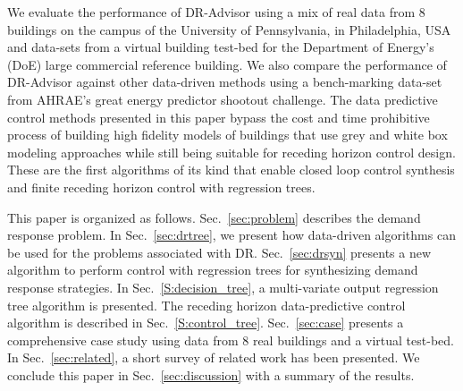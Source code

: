 \begin{enumerate}
We evaluate the performance of DR-Advisor using a mix of real data from 8 buildings on the campus of the University of Pennsylvania, in Philadelphia, USA and data-sets from a virtual building test-bed for the Department of Energy's (DoE) large commercial reference building. We also compare the performance of DR-Advisor against other data-driven methods using a bench-marking data-set from AHRAE's great energy predictor shootout challenge.
The data predictive control methods presented in this paper bypass the cost and time prohibitive process of building high fidelity models of buildings that use grey and white box modeling approaches while still being suitable for receding horizon control design.
These are the first algorithms of its kind that enable closed loop control synthesis and  finite receding horizon control with regression trees. 

\end{enumerate}

This paper is organized as follows. Sec.~\ref{sec:problem} describes the demand response problem. 
In Sec.~\ref{sec:drtree}, we present how data-driven algorithms can be used for the problems associated with DR. 
Sec.~\ref{sec:drsyn} presents a new algorithm to perform control with regression trees for synthesizing demand response strategies.
In Sec.~\ref{S:decision_tree}, a multi-variate output regression tree algorithm is presented. The receding horizon data-predictive control algorithm is described in Sec.~\ref{S:control_tree}.
Sec.~\ref{sec:case} presents a comprehensive case study using data from 8 real buildings and a virtual test-bed.
In Sec.~\ref{sec:related}, a short survey of related work has been presented. 
We conclude this paper in Sec.~\ref{sec:discussion} with a summary of the results. 
